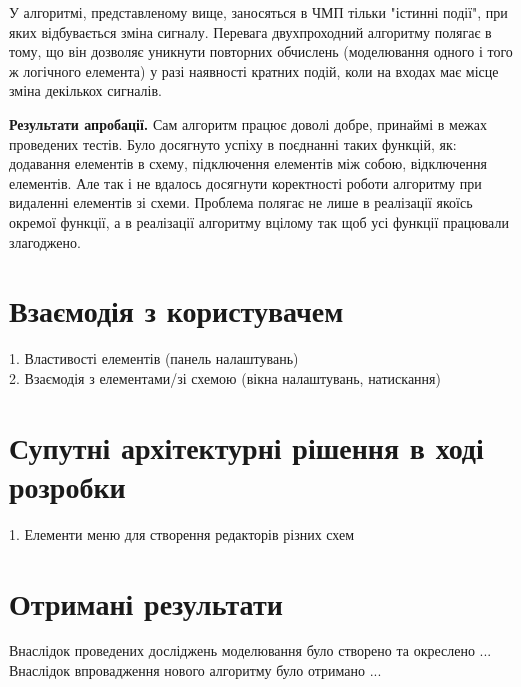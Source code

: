 \documentclass[12pt,a4paper]{article}
\begin{document}
У алгоритмі, представленому вище, заносяться в ЧМП тільки "істинні події", при яких відбувається зміна сигналу. Перевага двухпроходний алгоритму полягає в тому, що він дозволяє уникнути повторних обчислень (моделювання одного і того ж логічного елемента) у разі наявності кратних подій, коли на входах має місце зміна декількох сигналів.

\textbf{Результати апробації.} Сам алгоритм працює доволі добре, принаймі в межах проведених тестів. Було досягнуто успіху в поєднанні таких функцій, як: додавання елементів в схему, підключення елементів між собою, відключення елементів. Але так і не вдалось досягнути коректності роботи алгоритму при видаленні елементів зі схеми. Проблема полягає не лише в реалізації якоїсь окремої функції, а в реалізації алгоритму вцілому так щоб усі функції працювали злагоджено.


%
%
%
%


\clearpage

\section{Взаємодія з користувачем}


1. Властивості елементів (панель налаштувань)\\
2. Взаємодія з елементами/зі схемою (вікна налаштувань, натискання)

\clearpage

\section{Супутні архітектурні рішення в ході розробки}


1. Елементи меню для створення редакторів різних схем

\clearpage

\section{Отримані результати}

Внаслідок проведених досліджень моделювання було створено та окреслено ...\\
Внаслідок впровадження нового алгоритму було отримано ...
\end{document}
